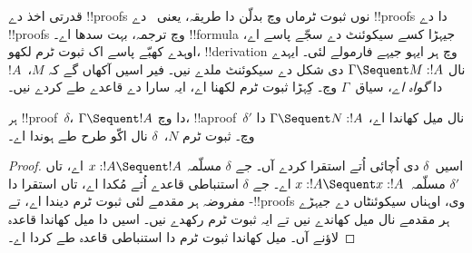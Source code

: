 \documentclass[../../../include/open-logic-section]{subfiles}
\begin{document}


قدرتی اخذ دے !!{proof}s نوں ثبوت ٹرماں وچ بدلّن دا طریقہ، یعنی~ دے !!{proof}s دا  دے !!{proof}s وچ ترجمہ، بہت سدھا اے۔ !!{formula} جیہڑا کسے سیکوئنٹ دے سجّے پاسے اے، اوہدے کھبّے پاسے اک ثبوت ٹرم لکھو، !!{derivation} وچ ہر ایہو جیہے فارمولے لئی۔ ایہدے نال $ \Gamma \Sequent M :
!A$ دی شکل دے سیکوئنٹ ملدے نیں۔ فیر اسیں آکھاں گے کہ $M$،~$!A$ دا \emph{گواہ اے}، سیاق~$\Gamma$ وچ۔ کِہڑا ثبوت ٹرم لکھنا اے، ایہ سارا  دے قاعدے طے کردے نیں۔

\begin{prop}
ہر !!{proof}~$\delta$، $ \Gamma \Sequent !A$ دا  وچ، !!a{proof}~$\delta'$ نال میل کھاندا اے، $ \Gamma \Sequent N : !A$ دا  وچ۔ ثبوت ٹرم $N$،~$\delta$ نال اکّو طرح طے ہوندا اے۔
\end{prop}

\begin{proof}
اسیں~$\delta$ دی اُچائی اُتے استقرا کردے آں۔ جے $\delta$ مسلّمہ $x:!A \Sequent !A$ اے، تاں $\delta'$ مسلّمہ~$x:!A \Sequent
x:!A$ اے۔ جے $\delta$ استنباطی قاعدے اُتے مُکدا اے، تاں استقرا دا مفروضہ ہر مقدمے لئی ثبوت ٹرم دیندا اے، تے -!!{proof}s وی، اوہناں سیکوئنٹاں دے جیہڑے ہر مقدمے نال میل کھاندے نیں تے ایہ ثبوت ٹرم رکھدے نیں۔ اسیں  دا میل کھاندا قاعدہ لاؤنے آں۔ میل کھاندا ثبوت ٹرم  دا استنباطی قاعدہ طے کردا اے۔
\end{proof}
\end{document}
